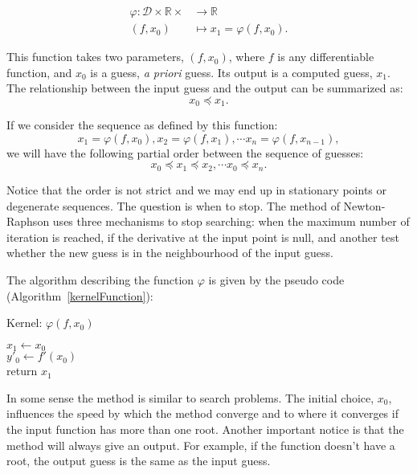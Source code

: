 \documentclass[12pt]{article}
\begin{document}
  \begin{align} \label{eq:functionalphi}
   \varphi \colon  \mathcal{D} \times \mathbb{R} \times  &\to \mathbb{R} \nonumber\\
   (f,x_0) &\mapsto x_1 = \varphi(f,x_0).
  \end{align}
  
  This function takes two parameters, \( (f, x_0)\), where \(f\) is any differentiable function, and \(x_0\) is a guess, \textit {a priori} guess. Its output is a computed guess, \(x_1\).
  The relationship between the input guess and the output can be summarized as:
  \[
  x_0 \preceq x_1.
  \]
  
  If we consider the sequence as defined by this function:
  \[
  x_1 = \varphi (f,x_0), x_2 = \varphi (f,x_1), \cdots x_n = \varphi (f,x_{n-1}),
  \]
  we will have the following partial order between the sequence of guesses:
  \[
  x_0 \preceq x_1\preceq x_2, \cdots x_0 \preceq x_n.
  \]
  
  Notice that the order is not strict and we may end up in stationary points or degenerate sequences.  The question is when to stop.
  The method of Newton-Raphson uses three mechanisms to stop searching: when the maximum number of iteration is reached,
  if the derivative at the input point is null, and another test whether the new guess is in the neighbourhood  of the input guess.
  
  The algorithm describing the function \( \varphi\) is given by the pseudo code (Algorithm~\ref {kernelFunction}):
  
  \begin{algorithm}[H]
   \caption{Kernel: $\varphi (f,x_0)$}
   \label{kernelFunction}
   	$x_1 \gets x_0 $ \\
  	$y'_0 \gets f'(x_0)$ \\  
  	return $x_1$
  \end{algorithm}
  
  In some sense the method is similar to search problems.  
  The initial choice, \(x_0\), influences the speed by which the method converge and to where it converges if the input function has more than one root.
  Another important notice is that the method will always give an output.  For example, if the function doesn't have a root, the output guess is the same as the input guess.
  
\end{document}
